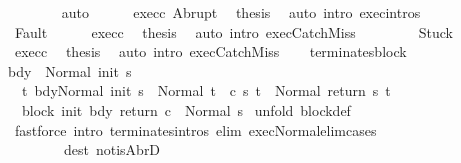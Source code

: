 \begin{isabellebody}
\ \ \ \ \ \ \isamarkupfalse%
\ auto\isanewline
\ \ \ \ \isamarkupfalse%
\ exec{\isacharunderscore}c{}\ Abrupt\ \isamarkupfalse%
\ {\isacharquery}thesis\ \isamarkupfalse%
\ {\isacharparenleft}auto\ intro{\isacharcolon}\ exec{\isachardot}intros{\isacharparenright}\isanewline
\ \ \isamarkupfalse%
\isanewline
\ \ \ \ \isamarkupfalse%
\ Fault\isanewline
\ \ \ \ \isamarkupfalse%
\ exec{\isacharunderscore}c{}\ \isamarkupfalse%
\ {\isacharquery}thesis\ \isamarkupfalse%
\ {\isacharparenleft}auto\ intro{\isacharbang}{\isacharcolon}\ exec{\isachardot}CatchMiss{\isacharparenright}\isanewline
\ \ \isamarkupfalse%
\isanewline
\ \ \ \ \isamarkupfalse%
\ Stuck\isanewline
\ \ \ \ \isamarkupfalse%
\ exec{\isacharunderscore}c{}\ \isamarkupfalse%
\ {\isacharquery}thesis\ \isamarkupfalse%
\ {\isacharparenleft}auto\ intro{\isacharbang}{\isacharcolon}\ exec{\isachardot}CatchMiss{\isacharparenright}\isanewline
\ \ \isamarkupfalse%
\isanewline
{}\isamarkupfalse%
%
\endisatagproof
{\isafoldproof}%
%
\isadelimproof
\isanewline
%
\endisadelimproof
\isanewline
{}\isamarkupfalse%
\ terminates{\isacharunderscore}block{\isacharcolon}\ \isanewline
{\isachardoublequoteopen}{\isasymlbrakk}{\isasymGamma}{\isasymturnstile}bdy\ {\isasymdown}\ Normal\ {\isacharparenleft}init\ s{\isacharparenright}{\isacharsemicolon}\isanewline
\ \ {\isasymforall}t{\isachardot}\ {\isasymGamma}{\isasymturnstile}{\isasymlangle}bdy{\isacharcomma}Normal\ {\isacharparenleft}init\ s{\isacharparenright}{\isasymrangle}\ {\isasymRightarrow}\ Normal\ t\ {\isasymlongrightarrow}\ {\isasymGamma}{\isasymturnstile}c\ s\ t\ {\isasymdown}\ Normal\ {\isacharparenleft}return\ s\ t{\isacharparenright}{\isasymrbrakk}\isanewline
\ {\isasymLongrightarrow}\ {\isasymGamma}{\isasymturnstile}block\ init\ bdy\ return\ c\ {\isasymdown}\ Normal\ s{\isachardoublequoteclose}\isanewline
%
\isadelimproof
%
\endisadelimproof
%
\isatagproof
{}\isamarkupfalse%
\ {\isacharparenleft}unfold\ block{\isacharunderscore}def{\isacharparenright}\isanewline
{}\isamarkupfalse%
\ {\isacharparenleft}fastforce\ intro{\isacharcolon}\ terminates{\isachardot}intros\ elim{\isacharbang}{\isacharcolon}\ exec{\isacharunderscore}Normal{\isacharunderscore}elim{\isacharunderscore}cases\ \isanewline
\ \ \ \ \ \ \ \ dest{\isacharbang}{\isacharcolon}\ not{\isacharunderscore}isAbrD{\isacharparenright}\isanewline

\end{isabellebody}
